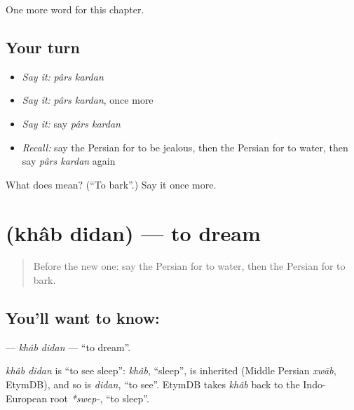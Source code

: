 \begin{grammarlens}[title={What you've built}]
One more word for this chapter.
\end{grammarlens}

\subsection*{Your turn}
\begin{itemize}
\raggedright
  \item \emph{Say it:} \emph{pârs kardan}
  \item \emph{Say it:} \emph{pârs kardan}, once more
  \item \emph{Say it:} say \emph{pârs kardan}
  \item \emph{Recall:} say the Persian for to be jealous, then the Persian for to water, then say \emph{pârs kardan} again
\end{itemize}

\begin{tcolorbox}[breakable,colback=teal!4,colframe=teal!35!black,title={Before you move on}]
What does   mean? (\textquotedblleft{}To bark\textquotedblright{}.) Say it once more.
\end{tcolorbox}
\section[\texorpdfstring{\fa{خواب} \fa{دیدن} (khâb didan)}{خواب دیدن (khâb didan)}]{  (khâb didan) — to dream}

\label{lesson:FA-C222-khab-didan}



\begin{quote}
Before the new one: say the Persian for to water, then the Persian for to bark.
\end{quote}

\subsection*{You'll want to know:  }
\textbf{ } — \emph{khâb didan} — \textquotedblleft{}to dream\textquotedblright{}.

\begin{cousinweb}
\emph{khâb didan} is \textquotedblleft{}to see sleep\textquotedblright{}: \emph{khâb}, \textquotedblleft{}sleep\textquotedblright{}, is inherited (Middle Persian \emph{xwāb}, EtymDB), and so is \emph{didan}, \textquotedblleft{}to see\textquotedblright{}. EtymDB takes \emph{khâb} back to the Indo-European root \emph{*swep-}, \textquotedblleft{}to sleep\textquotedblright{}.
\end{cousinweb}

